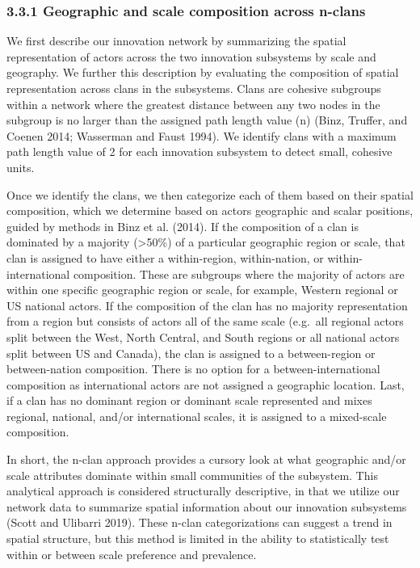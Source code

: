 \documentclass[twoside,12pt,final]{ucthesis-CA2012}
\begin{document}
\begin{ucmainmatter}
\hypertarget{geographic-and-scale-composition-across-n-clans}{%
\subsubsection{3.3.1 Geographic and scale composition across n-clans}\label{geographic-and-scale-composition-across-n-clans}}

We first describe our innovation network by summarizing the spatial
representation of actors across the two innovation subsystems by scale
and geography. We further this description by evaluating the composition
of spatial representation across clans in the subsystems. Clans are
cohesive subgroups within a network where the greatest distance between
any two nodes in the subgroup is no larger than the assigned path length
value (n) (Binz, Truffer, and Coenen 2014; Wasserman and Faust
1994). We identify clans
with a maximum path length value of 2 for each innovation subsystem to
detect small, cohesive units.

Once we identify the clans, we then categorize each of them based on
their spatial composition, which we determine based on actors\textquotesingle{}
geographic and scalar positions, guided by methods in Binz et al.
(2014). If the composition of a clan is dominated by a majority (\textgreater50\%)
of a particular geographic region or scale, that clan is assigned to
have either a \textquotesingle within-region\textquotesingle, \textquotesingle within-nation\textquotesingle, or
\textquotesingle within-international\textquotesingle{} composition. These are subgroups where the
majority of actors are within one specific geographic region or scale,
for example, Western regional or US national actors. If the composition
of the clan has no majority representation from a region but consists of
actors all of the same scale (e.g.~all regional actors split between the
West, North Central, and South regions or all national actors split
between US and Canada), the clan is assigned to a \textquotesingle between-region\textquotesingle{} or
\textquotesingle between-nation\textquotesingle{} composition. There is no option for a
\textquotesingle between-international\textquotesingle{} composition as international actors are not
assigned a geographic location. Last, if a clan has no dominant region
or dominant scale represented and mixes regional, national, and/or
international scales, it is assigned to a \textquotesingle mixed-scale\textquotesingle{} composition.

In short, the n-clan approach provides a cursory look at what geographic
and/or scale attributes dominate within small communities of the
subsystem. This analytical approach is considered structurally
descriptive, in that we utilize our network data to summarize spatial
information about our innovation subsystems (Scott and Ulibarri
2019). These n-clan
categorizations can suggest a trend in spatial structure, but this
method is limited in the ability to statistically test within or between
scale preference and prevalence.


\end{ucmainmatter}
\end{document}
